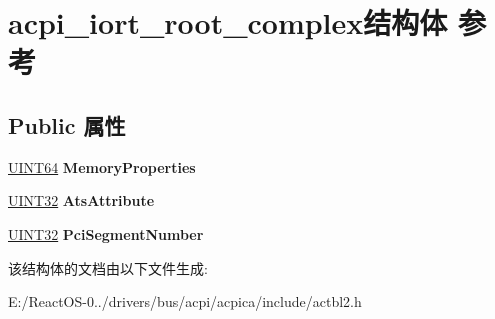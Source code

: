 \hypertarget{structacpi__iort__root__complex}{}\section{acpi\+\_\+iort\+\_\+root\+\_\+complex结构体 参考}
\label{structacpi__iort__root__complex}
\subsection*{Public 属性}
\begin{DoxyCompactItemize}
\item 
\mbox{\label{structacpi__iort__root__complex_ab5e9b5e49e9cfe6dba2840b7363b1780}} 
\hyperlink{_processor_bind_8h_a57be03562867144161c1bfee95ca8f7c}{U\+I\+N\+T64} {\bfseries Memory\+Properties}
\item 
\mbox{\label{structacpi__iort__root__complex_ab893f9ccee30ac5248c047e10e83dca8}} 
\hyperlink{_processor_bind_8h_ae1e6edbbc26d6fbc71a90190d0266018}{U\+I\+N\+T32} {\bfseries Ats\+Attribute}
\item 
\mbox{\label{structacpi__iort__root__complex_a98ec790de95ba2277afa38b75d971f10}} 
\hyperlink{_processor_bind_8h_ae1e6edbbc26d6fbc71a90190d0266018}{U\+I\+N\+T32} {\bfseries Pci\+Segment\+Number}
\end{DoxyCompactItemize}


该结构体的文档由以下文件生成\+:\begin{DoxyCompactItemize}
\item 
E\+:/\+React\+O\+S-\/0../drivers/bus/acpi/acpica/include/actbl2.\+h\end{DoxyCompactItemize}
